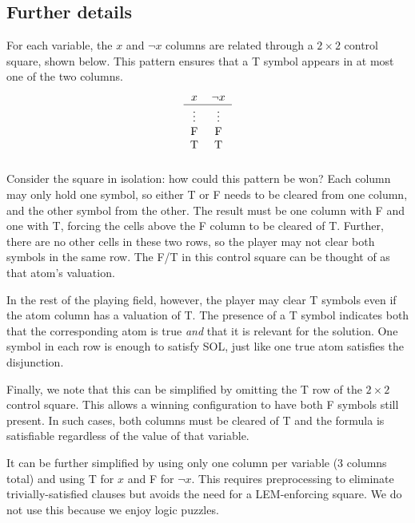 \documentclass[a4paper]{article}
\begin{document}
\subsection*{Further details}
For each variable, the $x$ and $\neg x$ columns are  related
through a $2 \times 2$ control square, shown below.
This pattern ensures that a T symbol appears in at most one of the two columns.
\begin{align*}
\begin{blockarray}{cc}
x & \neg x  \\ \hline
\begin{block}{cc}
  \vdots & \vdots  \\
  \text F & \text F  \\
  \text T & \text T  \\
\end{block}
\end{blockarray}
\end{align*}
Consider the square in isolation: how could this pattern be won?
Each column may only hold one symbol, so either T or F needs to be cleared
from one column, and the other symbol from the other.
The result must be one column with F and one with T, forcing the 
cells above the F column to be cleared of T.
Further, there are no other cells in these two rows, so
the player may not clear both symbols in the same row.
The F/T in this control square can be thought of as that atom's valuation.

In the rest of the playing field, however,
the player may clear T symbols even if the atom column has a valuation of T.
The presence of a T symbol indicates both that the corresponding
atom is true \textit{and} that it is relevant for the solution.
One symbol in each row is enough to satisfy SOL, just like
one true atom satisfies the disjunction.

Finally, we note that this can be simplified by omitting the T row of the $2 \times 2$ control square. This allows a winning configuration to have both F symbols still present. In such cases, both columns must be cleared of T and the formula is
satisfiable regardless of the value of that variable.

It can be further simplified by using only one column per variable (3 columns total) and using T for $x$ and F for $\neg x$.
This requires preprocessing to eliminate trivially-satisfied clauses but
avoids the need for a LEM-enforcing square.
We do not use this because we enjoy logic puzzles.
\end{document}
